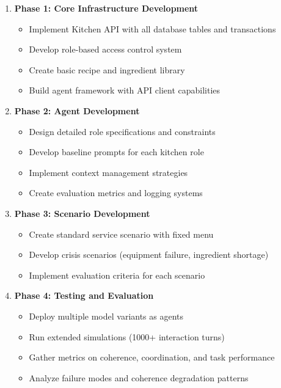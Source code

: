 \documentclass{article}
\begin{document}
\begin{enumerate}
    \item \textbf{Phase 1: Core Infrastructure Development}
    \begin{itemize}
        \item Implement Kitchen API with all database tables and transactions
        \item Develop role-based access control system
        \item Create basic recipe and ingredient library
        \item Build agent framework with API client capabilities
    \end{itemize}
    
    \item \textbf{Phase 2: Agent Development}
    \begin{itemize}
        \item Design detailed role specifications and constraints
        \item Develop baseline prompts for each kitchen role
        \item Implement context management strategies
        \item Create evaluation metrics and logging systems
    \end{itemize}
    
    \item \textbf{Phase 3: Scenario Development}
    \begin{itemize}
        \item Create standard service scenario with fixed menu
        \item Develop crisis scenarios (equipment failure, ingredient shortage)
        \item Implement evaluation criteria for each scenario
    \end{itemize}
    
    \item \textbf{Phase 4: Testing and Evaluation}
    \begin{itemize}
        \item Deploy multiple model variants as agents
        \item Run extended simulations (1000+ interaction turns)
        \item Gather metrics on coherence, coordination, and task performance
        \item Analyze failure modes and coherence degradation patterns
    \end{itemize}
\end{enumerate}
\end{document}
